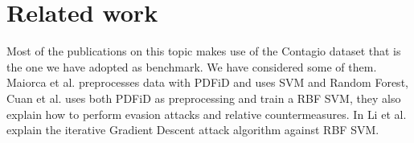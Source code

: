 \documentclass[twocolumn, switch]{article} %
\begin{document}
\section{Related work}
\label{sec:relatedwork}
Most of the publications on this topic makes use of the Contagio dataset \cite{Contagio} that is the one we have adopted as benchmark. We have considered some of them. Maiorca et al. \cite{maiorca_giacinto_corona_1970} preprocesses data with PDFiD \cite{PDFiD} and uses SVM and Random Forest,  Cuan et al. \cite{cuan_damien_delaplace_valois_2018} uses both PDFiD as preprocessing and train a RBF SVM, they also explain how to perform evasion attacks and relative countermeasures. In \cite{li_liu_yan_yang_2022} Li et al. explain the iterative Gradient Descent attack algorithm against RBF SVM.

\end{document}
